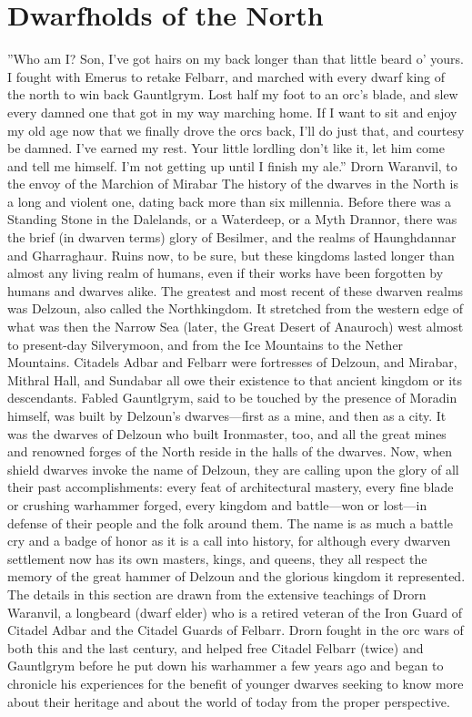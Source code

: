 \documentclass[10pt,a4paper,twoside,twocolumn,openany,bg=print,nodeprecatedcode]{dndbook}
\begin{document}
\section{Dwarfholds of the North}
\DndQuote%
{}
{''Who am I? Son, I've got hairs on my back longer than that little beard o' yours. I fought with Emerus to retake Felbarr, and marched with every dwarf king of the north to win back Gauntlgrym. Lost half my foot to an orc's blade, and slew every damned one that got in my way marching home. If I want to sit and enjoy my old age now that we finally drove the orcs back, I'll do just that, and courtesy be damned. I've earned my rest. Your little lordling don't like it, let him come and tell me himself. I'm not getting up until I finish my ale.''}
{Drorn Waranvil, to the envoy of the Marchion of Mirabar}
The history of the dwarves in the North is a long and violent one, dating back more than six millennia. Before there was a Standing Stone in the Dalelands, or a Waterdeep, or a Myth Drannor, there was the brief (in dwarven terms) glory of Besilmer, and the realms of Haunghdannar and Gharraghaur. Ruins now, to be sure, but these kingdoms lasted longer than almost any living realm of humans, even if their works have been forgotten by humans and dwarves alike.
The greatest and most recent of these dwarven realms was Delzoun, also called the Northkingdom. It stretched from the western edge of what was then the Narrow Sea (later, the Great Desert of Anauroch) west almost to present-day Silverymoon, and from the Ice Mountains to the Nether Mountains. Citadels Adbar and Felbarr were fortresses of Delzoun, and Mirabar, Mithral Hall, and Sundabar all owe their existence to that ancient kingdom or its descendants. Fabled Gauntlgrym, said to be touched by the presence of Moradin himself, was built by Delzoun's dwarves—first as a mine, and then as a city. It was the dwarves of Delzoun who built Ironmaster, too, and all the great mines and renowned forges of the North reside in the halls of the dwarves.
Now, when shield dwarves invoke the name of Delzoun, they are calling upon the glory of all their past accomplishments: every feat of architectural mastery, every fine blade or crushing warhammer forged, every kingdom and battle—won or lost—in defense of their people and the folk around them. The name is as much a battle cry and a badge of honor as it is a call into history, for although every dwarven settlement now has its own masters, kings, and queens, they all respect the memory of the great hammer of Delzoun and the glorious kingdom it represented.
The details in this section are drawn from the extensive teachings of Drorn Waranvil, a longbeard (dwarf elder) who is a retired veteran of the Iron Guard of Citadel Adbar and the Citadel Guards of Felbarr. Drorn fought in the orc wars of both this and the last century, and helped free Citadel Felbarr (twice) and Gauntlgrym before he put down his warhammer a few years ago and began to chronicle his experiences for the benefit of younger dwarves seeking to know more about their heritage and about the world of today from the proper perspective.
\end{document}
